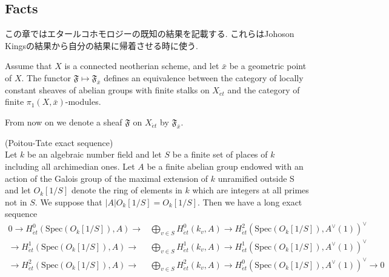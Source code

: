 \documentclass{ujarticle}
\begin{document}
\subsection{Facts }
この章ではエタールコホモロジーの既知の結果を記載する.
これらはJohoson Kingsの結果から自分の結果に帰着させる時に使う.

\begin{prop}  
Assume that $X$ is a connected neotherian scheme, and let $\bar{x}$ be a geometric point of $X$.
The functor $\mathfrak{F} \mapsto \mathfrak{F}_{\bar{x}}$ defines an equivalence between the category of locally constant sheaves of abelian groups  with finite stalks on $X_{\acute{e}t}$ and the category of finite $\pi_1(X,\bar{x})$-modules.
\end{prop}

From now on we denote a sheaf $\mathfrak{F}$ on $X_{\acute{e}t}$  by  $\mathfrak{F}_{\bar{x}}$.

\begin{thm} (Poitou-Tate exact sequence) \\
\label{poitou-tate}
Let $k$ be an algebraic number field and let $S$ be a finite set of places of $k$ including all archimedian ones.
Let $A$ be a finite abelian group  endowed with an action of  the Galois group of the maximal extension  of $k$ unramified outside S and
let $O_{k}[1/S]$ denote   the ring of elements in $k$ which are integers at all primes not in $S$.
We suppose that $ | A | O_{k}[1/S]=O_{k}[1/S]$.
Then we have a long exact sequence
\begin{equation*}
\begin{split}
0 \rightarrow  H^0_{\acute{e}t}(\mathrm{Spec}(O_{k}[1/S]),A) \rightarrow &\bigoplus\limits_{v \in S}H^0_{\acute{e}t}(k_v,A) \rightarrow H^2_{\acute{e}t}(\mathrm{Spec}(O_k[1/S]),A^{\vee}(1))^{\vee} \\
\rightarrow   H^1_{\acute{e}t}(\mathrm{Spec}(O_{k}[1/S]),A) \rightarrow &\bigoplus\limits_{v \in S}H^1_{\acute{e}t}(k_v,A) \rightarrow H^1_{\acute{e}t}(\mathrm{Spec}(O_k[1/S]),A^{\vee}(1))^{\vee} \\
\rightarrow  H^2_{\acute{e}t}(\mathrm{Spec}(O_{k}[1/S]),A) \rightarrow &\bigoplus\limits_{v \in S}H^2_{\acute{e}t}(k_v,A) \rightarrow H^0_{\acute{e}t}(\mathrm{Spec}(O_k[1/S]),A^{\vee}(1))^{\vee} \rightarrow 0
\end{split}
\end{equation*}
\end{thm}
\end{document}
